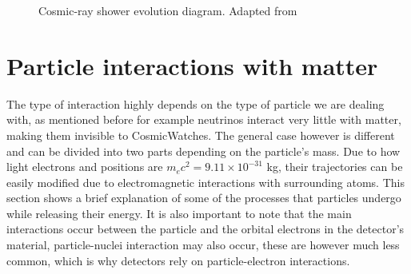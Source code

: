 \begin{figure}
\centering
{}
\caption{Cosmic-ray shower evolution diagram. Adapted from \cite{brunoRossi}}
\label{fig:cosmic-shower-diagram}
\end{figure}

\section{Particle interactions with matter}

The type of interaction highly depends on the type of particle we are dealing with, as mentioned before for example neutrinos interact very little with matter, making them invisible to CosmicWatches. The general case however is different and can be divided into two parts depending on the particle's mass. Due to how light electrons and positions are $m_ec^2=9.11\times10^{-31}$ kg, their trajectories can be easily modified due to electromagnetic interactions with surrounding atoms. This section shows a brief explanation of some of the processes that particles undergo while releasing their energy. It is also important to note that the main interactions occur between the particle and the orbital electrons in the detector's material, particle-nuclei interaction may also occur, these are however much less common, which is why detectors rely on particle-electron interactions.

